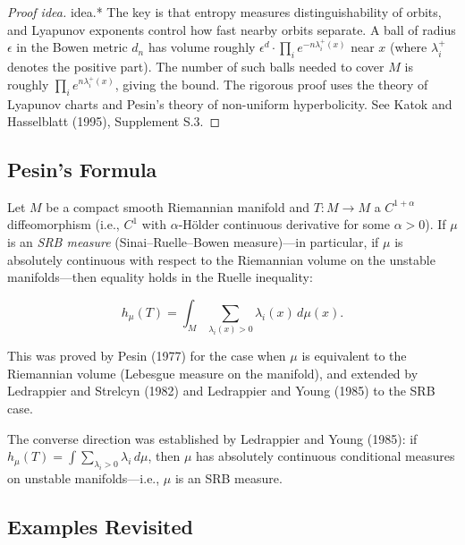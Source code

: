 \begin{proof}[Proof idea]
idea.* The key is that entropy measures distinguishability of orbits, and Lyapunov exponents control how fast nearby orbits separate. A ball of radius $\epsilon$ in the Bowen metric $d_n$ has volume roughly $\epsilon^d \cdot \prod_i e^{-n\lambda_i^+(x)}$ near $x$ (where $\lambda_i^+$ denotes the positive part). The number of such balls needed to cover $M$ is roughly $\prod_i e^{n\lambda_i^+(x)}$, giving the bound. The rigorous proof uses the theory of Lyapunov charts and Pesin's theory of non-uniform hyperbolicity. See Katok and Hasselblatt (1995), Supplement S.3.

\end{proof}

\subsection{Pesin's Formula}\label{sec:11.9.2}

\begin{theorem}\label{thm:11.40}
Let $M$ be a compact smooth Riemannian manifold and $T \colon M \to M$ a $C^{1+\alpha}$ diffeomorphism (i.e., $C^1$ with $\alpha$-H\"older continuous derivative for some $\alpha > 0$). If $\mu$ is an \textit{SRB measure} (Sinai--Ruelle--Bowen measure)---in particular, if $\mu$ is absolutely continuous with respect to the Riemannian volume on the unstable manifolds---then equality holds in the Ruelle inequality:

\[
h_\mu(T) = \int_M \sum_{\lambda_i(x) > 0} \lambda_i(x) \, d\mu(x).
\]

This was proved by Pesin (1977) for the case when $\mu$ is equivalent to the Riemannian volume (Lebesgue measure on the manifold), and extended by Ledrappier and Strelcyn (1982) and Ledrappier and Young (1985) to the SRB case.
\end{theorem}


\begin{remark}
The converse direction was established by Ledrappier and Young (1985): if $h_\mu(T) = \int \sum_{\lambda_i > 0} \lambda_i \, d\mu$, then $\mu$ has absolutely continuous conditional measures on unstable manifolds---i.e., $\mu$ is an SRB measure.
\end{remark}


\subsection{Examples Revisited}\label{sec:11.9.3}

